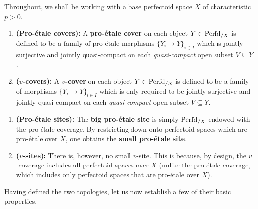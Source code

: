                 \begin{convention}
                    Throughout, we shall be working with a base perfectoid space $X$ of characteristic $p > 0$. 
                \end{convention}
                
                \begin{definition} \label{def: pro_etale_topology_and_v_topology}
                    \noindent
                    \begin{enumerate}
                        \item \textbf{(Pro-\'etale covers):} A \textbf{pro-\'etale cover} on each object $Y \in \mathrm{Perfd}_{/X}$ is defined to be a family of pro-\'etale morphisms $\{Y_i \to Y\}_{i \in I}$ which is jointly surjective and jointly quasi-compact on each \textit{quasi-compact} open subset $V \subseteq Y$.
                        \item \textbf{($v$-covers):} A \textbf{$v$-cover} on each object $Y \in \mathrm{Perfd}_{/X}$ is defined to be a family of morphisms $\{Y_i \to Y\}_{i \in I}$ which is only required to be jointly surjective and jointly quasi-compact on each \textit{quasi-compact} open subset $V \subseteq Y$.
                    \end{enumerate}
                \end{definition}
                \begin{remark}
                    \noindent
                    \begin{enumerate}
                        \item \textbf{(Pro-\'etale sites):} The \textbf{big pro-\'etale site} is simply $\mathrm{Perfd}_{/X}$ endowed with the pro-\'etale coverage. By restricting down onto perfectoid spaces which are pro-\'etale over $X$, one obtains the \textbf{small pro-\'etale site}. 
                        \item \textbf{($v$-sites):} There is, however, no small $v$-site. This is because, by design, the $v$-coverage includes all perfectoid spaces over $X$ (unlike the pro-\'etale coverage, which includes only perfectoid spaces that are pro-\'etale over $X$).
                    \end{enumerate}
                \end{remark}
                
                Having defined the two topologies, let us now establish a few of their basic properties.
                
